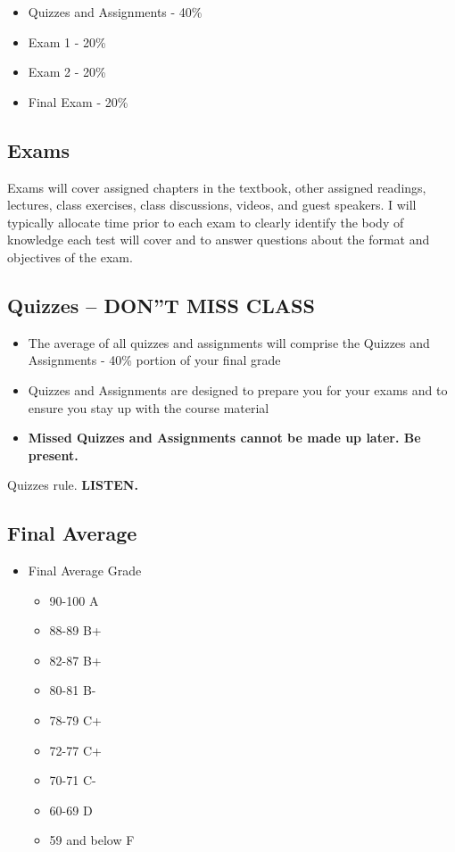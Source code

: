 \documentclass[
]{book}
\providecommand{\tightlist}{%
  \setlength{\itemsep}{0pt}\setlength{\parskip}{0pt}}
\theoremstyle{definition}
\theoremstyle{definition}
\theoremstyle{definition}
\theoremstyle{definition}
\theoremstyle{remark}
\begin{document}
\begin{itemize}
\tightlist
\item
  Quizzes and Assignments - 40\%
\item
  Exam 1 - 20\%
\item
  Exam 2 - 20\%
\item
  Final Exam - 20\%
\end{itemize}

\hypertarget{exams}{%
\subsection{Exams}\label{exams}}

Exams will cover assigned chapters in the textbook, other assigned readings, lectures, class exercises, class discussions, videos, and guest speakers. I will typically allocate time prior to each exam to clearly identify the body of knowledge each test will cover and to answer questions about the format and objectives of the exam.

\hypertarget{quizzes-dont-miss-class}{%
\subsection{\texorpdfstring{Quizzes -- \textbf{DON''T MISS CLASS}}{Quizzes -- DON''T MISS CLASS}}\label{quizzes-dont-miss-class}}

\begin{itemize}
\tightlist
\item
  The average of all quizzes and assignments will comprise the Quizzes and Assignments - 40\% portion of your final grade
\item
  Quizzes and Assignments are designed to prepare you for your exams and to ensure you stay up with the course material
\item
  \textbf{Missed Quizzes and Assignments cannot be made up later. Be present.}
\end{itemize}

Quizzes rule. \textbf{LISTEN.}

\hypertarget{final-average}{%
\subsection{Final Average}\label{final-average}}

\begin{itemize}
\tightlist
\item
  Final Average Grade

  \begin{itemize}
  \tightlist
  \item
    90-100 A
  \item
    88-89 B+
  \item
    82-87 B+
  \item
    80-81 B-
  \item
    78-79 C+
  \item
    72-77 C+
  \item
    70-71 C-
  \item
    60-69 D
  \item
    59 and below F
  \end{itemize}
\end{itemize}
\end{document}
